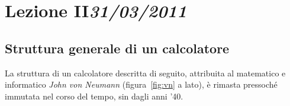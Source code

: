 \chapter[Lezione II]{Lezione II\newline\small{\emph{31/03/2011}}}
	\section{Struttura generale di un calcolatore}
	\label{sec:neu}


	\addtocounter{figure}{-1}

La struttura di un calcolatore descritta di seguito, attribuita al matematico e informatico \emph{John von Neumann} (figura~\ref{fig:vn} a lato), è rimasta pressoché immutata nel corso del tempo, sin dagli anni '40.

